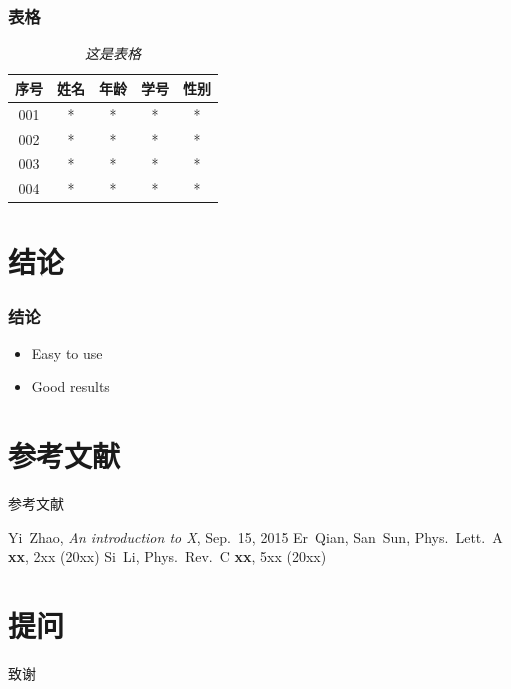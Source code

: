 \documentclass[10pt,aspectratio=43,serif]{beamer}
\begin{document}
\begin{frame}
    \frametitle{表格}
    \begin{table}[ht]
        \centering
        \caption{\em 这是表格}
        \vskip 0.1in
        \label{table}
        \begin{tabular}{c|cccc}
          \hline
          \hline
          \rule{0pt}{3ex}
          序号 & 姓名 & 年龄 & 学号 & 性别 
                                      \rule[-1.2ex]{0pt}{0pt} \\\hline
          001 & *  &  *  & *  & * \\ 
          002 & *  &  *  & *  & * \\
          003 & *  &  *  & *  & * \\      
          004 & *  &  *  & *  & * \\
          \hline
          \hline 
        \end{tabular}
    \end{table}
\end{frame}

\section{结论}
\begin{frame}
    \frametitle{结论}

    \begin{itemize}
        \item Easy to use
        \item Good results
    \end{itemize}
\end{frame}

\section{参考文献}
\begin{frame}{参考文献}
    \begin{thebibliography}{99}
         Yi~Zhao, {\sl An introduction to X}, Sep.~15,
        2015
         Er~Qian, San~Sun, Phys.\ Lett.\ A {\bf xx},
        2xx (20xx)
         Si~Li, Phys.\ Rev.\ C {\bf xx}, 5xx (20xx)
    \end{thebibliography}
\end{frame}

\section{提问}
\begin{frame}{致谢}
    \begin{center}
    \end{center}
\end{frame}
\end{document}
